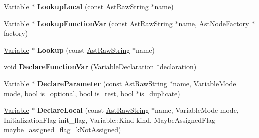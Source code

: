 \begin{DoxyCompactItemize}
\item 
\hyperlink{classv8_1_1internal_1_1_variable}{Variable} $\ast$ {\bfseries Lookup\+Local} (const \hyperlink{classv8_1_1internal_1_1_ast_raw_string}{Ast\+Raw\+String} $\ast$name)\hypertarget{classv8_1_1internal_1_1_scope_afcca436cb4b3d078968aebd66f5c8f4b}{}\label{classv8_1_1internal_1_1_scope_afcca436cb4b3d078968aebd66f5c8f4b}

\item 
\hyperlink{classv8_1_1internal_1_1_variable}{Variable} $\ast$ {\bfseries Lookup\+Function\+Var} (const \hyperlink{classv8_1_1internal_1_1_ast_raw_string}{Ast\+Raw\+String} $\ast$name, Ast\+Node\+Factory $\ast$factory)\hypertarget{classv8_1_1internal_1_1_scope_a9b1fd2890aaffb03776fceeea99b56ba}{}\label{classv8_1_1internal_1_1_scope_a9b1fd2890aaffb03776fceeea99b56ba}

\item 
\hyperlink{classv8_1_1internal_1_1_variable}{Variable} $\ast$ {\bfseries Lookup} (const \hyperlink{classv8_1_1internal_1_1_ast_raw_string}{Ast\+Raw\+String} $\ast$name)\hypertarget{classv8_1_1internal_1_1_scope_a29d38e98f2e9fae2b6b42908d125cc6e}{}\label{classv8_1_1internal_1_1_scope_a29d38e98f2e9fae2b6b42908d125cc6e}

\item 
void {\bfseries Declare\+Function\+Var} (\hyperlink{classv8_1_1internal_1_1_variable_declaration}{Variable\+Declaration} $\ast$declaration)\hypertarget{classv8_1_1internal_1_1_scope_a2af668e427258bf92475073646356aa8}{}\label{classv8_1_1internal_1_1_scope_a2af668e427258bf92475073646356aa8}

\item 
\hyperlink{classv8_1_1internal_1_1_variable}{Variable} $\ast$ {\bfseries Declare\+Parameter} (const \hyperlink{classv8_1_1internal_1_1_ast_raw_string}{Ast\+Raw\+String} $\ast$name, Variable\+Mode mode, bool is\+\_\+optional, bool is\+\_\+rest, bool $\ast$is\+\_\+duplicate)\hypertarget{classv8_1_1internal_1_1_scope_a0a88e20fea7bbbe5ae3e7db045de7352}{}\label{classv8_1_1internal_1_1_scope_a0a88e20fea7bbbe5ae3e7db045de7352}

\item 
\hyperlink{classv8_1_1internal_1_1_variable}{Variable} $\ast$ {\bfseries Declare\+Local} (const \hyperlink{classv8_1_1internal_1_1_ast_raw_string}{Ast\+Raw\+String} $\ast$name, Variable\+Mode mode, Initialization\+Flag init\+\_\+flag, Variable\+::\+Kind kind, Maybe\+Assigned\+Flag maybe\+\_\+assigned\+\_\+flag=k\+Not\+Assigned)\hypertarget{classv8_1_1internal_1_1_scope_afc6d8a818dc25836befd8db17717fc08}{}\label{classv8_1_1internal_1_1_scope_afc6d8a818dc25836befd8db17717fc08}


\end{DoxyCompactItemize}
